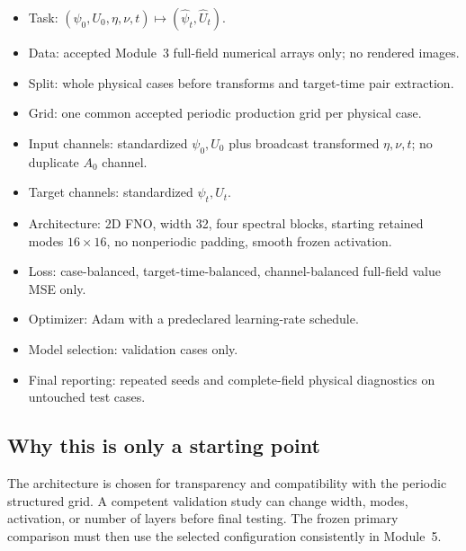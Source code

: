 \documentclass[11pt]{article}
\begin{document}
\begin{conventionbox}
\begin{itemize}
  \item Task: $(\psi_0,U_0,\eta,\nu,t)\mapsto(\widehat\psi_t,\widehat U_t)$.
  \item Data: accepted Module~3 full-field numerical arrays only; no rendered images.
  \item Split: whole physical cases before transforms and target-time pair extraction.
  \item Grid: one common accepted periodic production grid per physical case.
  \item Input channels: standardized $\psi_0,U_0$ plus broadcast transformed $\eta,\nu,t$; no duplicate $A_0$ channel.
  \item Target channels: standardized $\psi_t,U_t$.
  \item Architecture: 2D FNO, width 32, four spectral blocks, starting retained modes $16\times16$, no nonperiodic padding, smooth frozen activation.
  \item Loss: case-balanced, target-time-balanced, channel-balanced full-field value MSE only.
  \item Optimizer: Adam with a predeclared learning-rate schedule.
  \item Model selection: validation cases only.
  \item Final reporting: repeated seeds and complete-field physical diagnostics on untouched test cases.
\end{itemize}
\end{conventionbox}

\subsection{Why this is only a starting point}
The architecture is chosen for transparency and compatibility with the periodic structured grid. A competent validation study can change width, modes, activation, or number of layers before final testing. The frozen primary comparison must then use the selected configuration consistently in Module~5.
\end{document}
